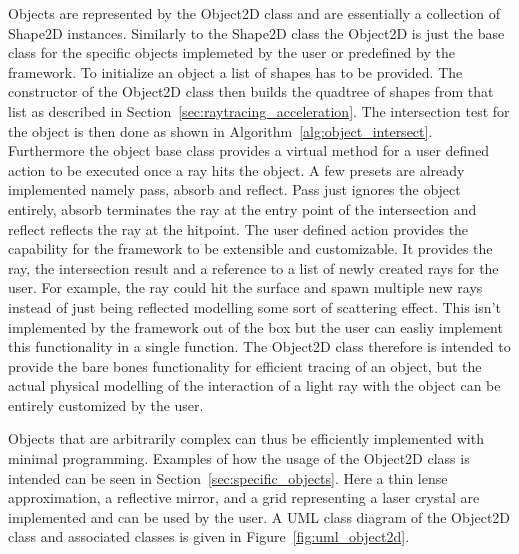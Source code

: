 \documentclass[a4paper,10pt]{article}
\newcommand{\secref}[1]{Section~\ref{#1}}
\newcommand{\figref}[1]{Figure~\ref{#1}}
\newcommand{\algref}[1]{Algorithm~\ref{#1}}
\begin{document}
    Objects are represented by the Object2D class and are essentially a collection of
    Shape2D instances. 
    Similarly to the Shape2D class the Object2D is just the base class
    for the specific objects implemeted by the user or predefined by
    the framework.
    To initialize an object a list of shapes has to be provided.
    The constructor of the Object2D class then builds the quadtree
    of shapes from that list as described in 
    \secref{sec:raytracing_acceleration}.
    The intersection test for the object is then done as shown in
    \algref{alg:object_intersect}.
    Furthermore the object base class provides a virtual method 
    for a user defined action to be executed once a ray hits the
    object.
    A few presets are already implemented namely pass, absorb and reflect.
    Pass just ignores the object entirely, absorb terminates the ray at the
    entry point of the intersection and reflect reflects the ray at the
    hitpoint.
    The user defined action provides the capability for the framework to
    be extensible and customizable.
    It provides the ray, the intersection result and a reference to a
    list of newly created rays for the user.
    For example, the ray could hit the surface and spawn multiple
    new rays instead of just being reflected modelling
    some sort of scattering effect.
    This isn't implemented by the framework out of the box but
    the user can easliy implement this functionality in a single
    function.
    The Object2D class therefore is intended to provide the bare bones
    functionality for efficient tracing of an object, but the
    actual physical modelling of the interaction of a light ray
    with the object can be entirely customized by the user.

    Objects that are arbitrarily complex can thus be efficiently
    implemented with minimal programming.
    Examples of how the usage of the Object2D class is intended can
    be seen in \secref{sec:specific_objects}.
    Here a thin lense approximation, a reflective mirror, and a grid
    representing a laser crystal are implemented and can be used by
    the user.
    A UML class diagram of the Object2D class and associated
    classes is given in \figref{fig:uml_object2d}.
\end{document}
